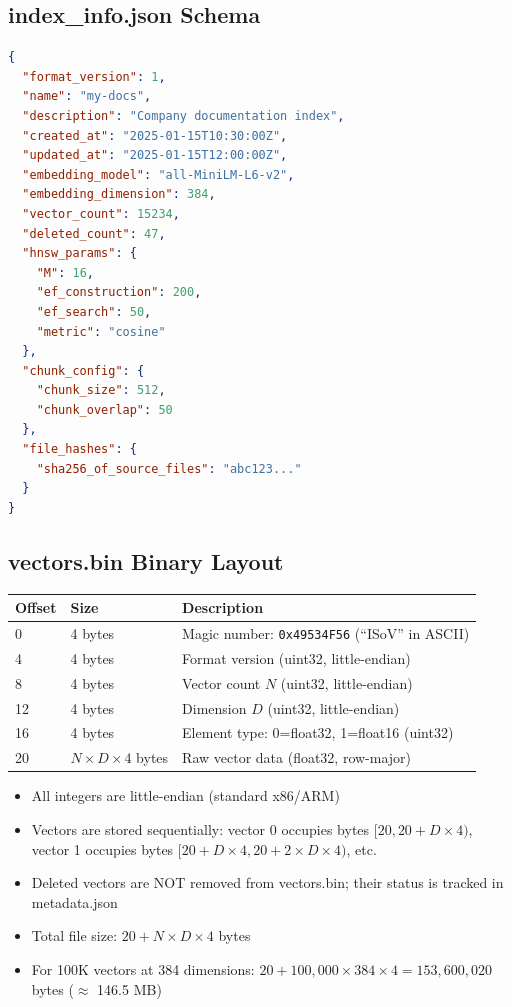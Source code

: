 \documentclass[11pt,a4paper]{article}
\begin{document}
\subsection{index\_info.json Schema}

\begin{lstlisting}[language=JSON]
{
  "format_version": 1,
  "name": "my-docs",
  "description": "Company documentation index",
  "created_at": "2025-01-15T10:30:00Z",
  "updated_at": "2025-01-15T12:00:00Z",
  "embedding_model": "all-MiniLM-L6-v2",
  "embedding_dimension": 384,
  "vector_count": 15234,
  "deleted_count": 47,
  "hnsw_params": {
    "M": 16,
    "ef_construction": 200,
    "ef_search": 50,
    "metric": "cosine"
  },
  "chunk_config": {
    "chunk_size": 512,
    "chunk_overlap": 50
  },
  "file_hashes": {
    "sha256_of_source_files": "abc123..."
  }
}
\end{lstlisting}

\subsection{vectors.bin Binary Layout}

\begin{center}
\begin{tabular}{@{}p{3.5cm}p{2cm}p{8cm}@{}}
\toprule
\textbf{Offset} & \textbf{Size} & \textbf{Description} \\
\midrule
0 & 4 bytes & Magic number: \texttt{0x49534F56} (``ISoV'' in ASCII) \\
4 & 4 bytes & Format version (uint32, little-endian) \\
8 & 4 bytes & Vector count $N$ (uint32, little-endian) \\
12 & 4 bytes & Dimension $D$ (uint32, little-endian) \\
16 & 4 bytes & Element type: 0=float32, 1=float16 (uint32) \\
20 & $N \times D \times 4$ bytes & Raw vector data (float32, row-major) \\
\bottomrule
\end{tabular}
\end{center}

\begin{notebox}
\begin{itemize}
    \item All integers are little-endian (standard x86/ARM)
    \item Vectors are stored sequentially: vector 0 occupies bytes $[20, 20 + D \times 4)$, vector 1 occupies bytes $[20 + D \times 4, 20 + 2 \times D \times 4)$, etc.
    \item Deleted vectors are NOT removed from vectors.bin; their status is tracked in metadata.json
    \item Total file size: $20 + N \times D \times 4$ bytes
    \item For 100K vectors at 384 dimensions: $20 + 100{,}000 \times 384 \times 4 = 153{,}600{,}020$ bytes ($\approx$ 146.5 MB)
\end{itemize}
\end{notebox}
\end{document}
